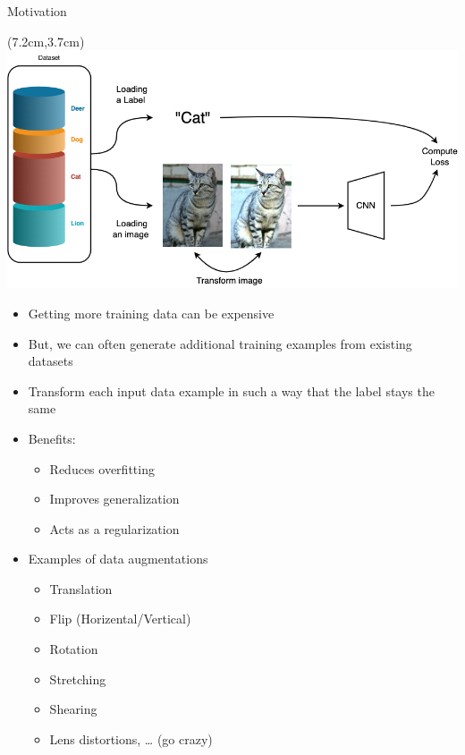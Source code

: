 \documentclass[serif, aspectratio=169]{beamer}
\begin{document}
\begin{frame}{Motivation}
	\begin{textblock*}{5cm}(7.2cm,3.7cm) %
		\includegraphics[keepaspectratio, scale=0.28]{pic/cnnaug}
	\end{textblock*}
	
	\begin{itemize}
		\item Getting more training data can be expensive
		\item But, we can often generate additional training examples from existing datasets
		\item Transform each input data example in such a way that the label stays the same
		\item Benefits:
		\begin{itemize}
			\item Reduces overfitting 
			\item Improves generalization
			\item Acts as a regularization
		\end{itemize}
		\item Examples of data augmentations
		\begin{itemize}
			\item Translation
			\item Flip (Horizental/Vertical)
			\item Rotation
			\item Stretching
			\item Shearing
			\item Lens distortions, … (go crazy)
		\end{itemize}
	\end{itemize}
\end{frame}
\end{document}
